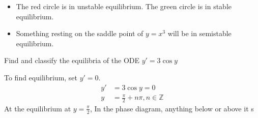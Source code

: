 \documentclass[a4paper, 10pt]{article}
\numberwithin{equation}{section}
\begin{document}
\begin{center}
\end{center}
\begin{itemize}
    \item The red circle is in unstable equilibrium. The green circle is in stable equilibrium.
    \item Something resting on the saddle point of $y=x^3$ will be in semistable equilibrium.
\end{itemize}
\begin{example}
    Find and classify the equilibria of the ODE $y'=3\cos y$
    \begin{center}
    \end{center}
\end{example}
\begin{sol}
    To find equilibrium, set $y'=0$.
    \begin{align}
        y'&=3\cos y=0\\
        y&=\frac{\pi}{2}+n\pi,n\in\mathbb Z
    \end{align}
    At the equilibrium at $y=\frac{\pi}{2}$, In the phase diagram, anything below or above it s
\end{sol}
\end{document}
